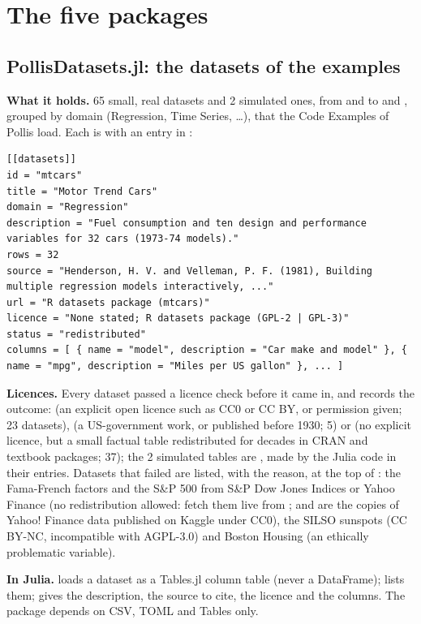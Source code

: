 \section{The five packages}

\subsection{PollisDatasets.jl: the datasets of the examples}
\textbf{What it holds.} 65 small, real datasets and 2 simulated ones, from  and  to  and
, grouped by domain (Regression, Time Series, \ldots), that the Code Examples of Pollis load. Each is
 with an entry in :
\begin{lstlisting}
[[datasets]]
id = "mtcars"
title = "Motor Trend Cars"
domain = "Regression"
description = "Fuel consumption and ten design and performance variables for 32 cars (1973-74 models)."
rows = 32
source = "Henderson, H. V. and Velleman, P. F. (1981), Building multiple regression models interactively, ..."
url = "R datasets package (mtcars)"
licence = "None stated; R datasets package (GPL-2 | GPL-3)"
status = "redistributed"
columns = [ { name = "model", description = "Car make and model" }, { name = "mpg", description = "Miles per US gallon" }, ... ]
\end{lstlisting}

\textbf{Licences.} Every dataset passed a licence check before it came in, and  records the outcome:
 (an explicit open licence such as CC0 or CC BY, or permission given; 23 datasets),  (a
US-government work, or published before 1930; 5) or  (no explicit licence, but a small factual
table redistributed for decades in CRAN and textbook packages; 37); the 2 simulated tables are , made by the Julia code in their entries. Datasets that failed are listed, with the reason,
at the top of : the Fama-French factors and the S\&P 500 from S\&P Dow Jones Indices or Yahoo Finance (no redistribution
allowed: fetch them live from ;  and  are the
copies of Yahoo! Finance data published on Kaggle under CC0), the SILSO sunspots (CC BY-NC, incompatible with AGPL-3.0)
and Boston Housing (an ethically problematic variable).

\textbf{In Julia.}  loads a dataset as a Tables.jl column table (never a DataFrame);
 lists them;  gives the description, the source to cite, the licence and
the columns. The package depends on CSV, TOML and Tables only.

